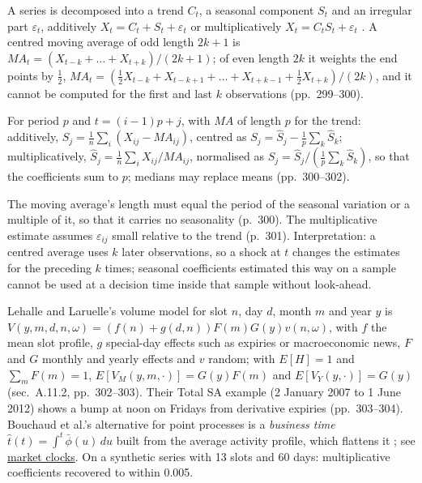 \begin{qfmethod}\label{meth:intraday-deseasonalisation}
 A series is decomposed into a trend $C_t$, a seasonal component $S_t$ and an irregular part $\varepsilon_t$, additively $X_t=C_t+S_t+\varepsilon_t$ or multiplicatively $X_t=C_tS_t+\varepsilon_t$ \citep[app.~A, sec.~A.11.1, p.~299]{alpha-laruelle}. A centred moving average of odd length $2k+1$ is $MA_t=(X_{t-k}+\dots+X_{t+k})/(2k+1)$; of even length $2k$ it weights the end points by $\tfrac12$, $MA_t=(\tfrac12X_{t-k}+X_{t-k+1}+\dots+X_{t+k-1}+\tfrac12X_{t+k})/(2k)$, and it cannot be computed for the first and last $k$ observations (pp.~299--300).

For period $p$ and $t=(i-1)p+j$, with $MA$ of length $p$ for the trend: additively, $\hat S_j=\tfrac1n\sum_i(X_{ij}-MA_{ij})$, centred as $S_j=\hat S_j-\tfrac1p\sum_k\hat S_k$; multiplicatively, $\hat S_j=\tfrac1n\sum_iX_{ij}/MA_{ij}$, normalised as $S_j=\hat S_j/(\tfrac1p\sum_k\hat S_k)$, so that the coefficients sum to $p$; medians may replace means (pp.~300--302).

 The moving average's length must equal the period of the seasonal variation or a multiple of it, so that it carries no seasonality (p.~300). The multiplicative estimate assumes $\varepsilon_{ij}$ small relative to the trend (p.~301). Interpretation: a centred average uses $k$ later observations, so a shock at $t$ changes the estimates for the preceding $k$ times; seasonal coefficients estimated this way on a sample cannot be used at a decision time inside that sample without look-ahead.

 Lehalle and Laruelle's volume model for slot $n$, day $d$, month $m$ and year $y$ is $V(y,m,d,n,\omega)=(f(n)+g(d,n))F(m)G(y)v(n,\omega)$, with $f$ the mean slot profile, $g$ special-day effects such as expiries or macroeconomic news, $F$ and $G$ monthly and yearly effects and $v$ random; with $E[H]=1$ and $\sum_mF(m)=1$, $E[V_M(y,m,\cdot)]=G(y)F(m)$ and $E[V_Y(y,\cdot)]=G(y)$ (sec.~A.11.2, pp.~302--303). Their Total SA example (2 January 2007 to 1 June 2012) shows a bump at noon on Fridays from derivative expiries (pp.~303--304). Bouchaud et al.'s alternative for point processes is a \emph{business time} $\hat t(t)=\int^t\bar\phi(u)\,du$ built from the average activity profile, which flattens it \citep[chap.~9, sec.~9.3.1, p.~173]{catalogue-0528}; see \hyperref[def:market-clocks-durations]{market clocks}. On a synthetic series with 13 slots and 60 days: multiplicative coefficients recovered to within 0.005.


\end{qfmethod}
